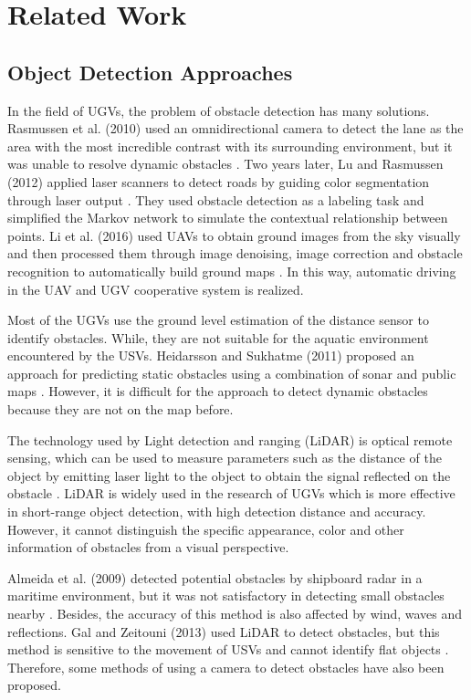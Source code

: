 \documentclass[sensors,article,submit,moreauthors,pdftex]{Definitions/mdpi}
\begin{document}
 \section{Related Work}


\subsection{Object Detection Approaches}

In the field of UGVs, the problem of obstacle detection has many solutions. Rasmussen et al. (2010) used an omnidirectional camera to detect the lane as the area with the most incredible contrast with its surrounding environment, but it was unable to resolve dynamic obstacles \cite{5650189}. Two years later, Lu and Rasmussen (2012) applied laser scanners to detect roads by guiding color segmentation through laser output \cite{6386039}. They used obstacle detection as a labeling task and simplified the Markov network to simulate the contextual relationship between points. Li et al. (2016) used UAVs to obtain ground images from the sky visually and then processed them through image denoising, image correction and obstacle recognition to automatically build ground maps  \cite{li2016hybrid}. In this way, automatic driving in the UAV and UGV cooperative system is realized.

Most of the UGVs use the ground level estimation of the distance sensor to identify obstacles. While, they are not suitable for the aquatic environment encountered by the USVs. Heidarsson and Sukhatme (2011) proposed an approach for predicting static obstacles using a combination of sonar and public maps \cite{5980509}. However, it is difficult for the approach to detect dynamic obstacles because they are not on the map before.

The technology used by Light detection and ranging (LiDAR) is optical remote sensing, which can be used to measure parameters such as the distance of the object by emitting laser light to the object to obtain the signal reflected on the obstacle \cite {larson2011lidar}. LiDAR is widely used in the research of UGVs which is more effective in short-range object detection, with high detection distance and accuracy. However, it cannot distinguish the specific appearance, color and other information of obstacles from a visual perspective. 

Almeida et al. (2009) detected potential obstacles by shipboard radar in a maritime environment, but it was not satisfactory in detecting small obstacles nearby \cite{5278238}. Besides, the accuracy of this method is also affected by wind, waves and reflections. Gal and Zeitouni (2013) used LiDAR to detect obstacles, but this method is sensitive to the movement of USVs and cannot identify flat objects \cite{sauze_tracking_2013}. Therefore, some methods of using a camera to detect obstacles have also been proposed. 
\end{document}
